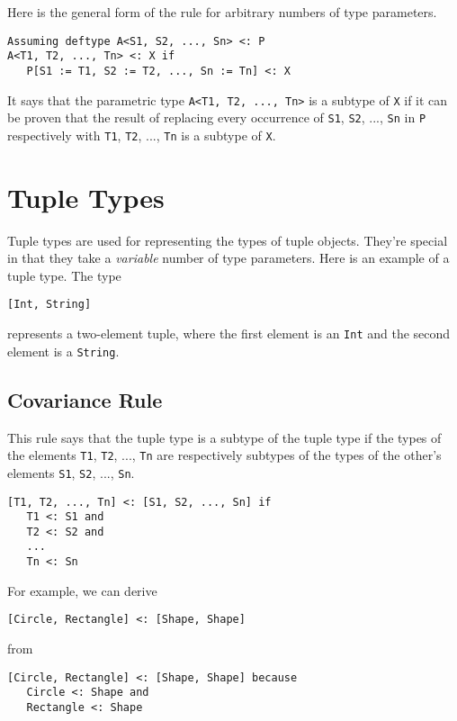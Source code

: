 \documentclass[10pt,oneside]{book}
\begin{document}
Here is the general form of the rule for arbitrary numbers of type parameters.
\begin{lstlisting}
Assuming deftype A<S1, S2, ..., Sn> <: P
A<T1, T2, ..., Tn> <: X if
   P[S1 := T1, S2 := T2, ..., Sn := Tn] <: X
\end{lstlisting}
It says that the parametric type \texttt{\frenchspacing A<T1, T2, ..., Tn>} is a subtype of \texttt{\frenchspacing X} if it can be proven that the result of replacing every occurrence of \texttt{\frenchspacing S1}, \texttt{\frenchspacing S2}, ..., \texttt{\frenchspacing Sn} in \texttt{\frenchspacing P} respectively with \texttt{\frenchspacing T1}, \texttt{\frenchspacing T2}, ..., \texttt{\frenchspacing Tn} is a subtype of \texttt{\frenchspacing X}.

\section{Tuple Types}
Tuple types are used for representing the types of tuple objects. They're special in that they take a {\em variable} number of type parameters. Here is an example of a tuple type. The type
\begin{lstlisting}
[Int, String]
\end{lstlisting}
represents a two-element tuple, where the first element is an \texttt{\frenchspacing Int} and the second element is a \texttt{\frenchspacing String}.

\subsection*{Covariance Rule}
This rule says that the tuple type \texttt{\frenchspacing [T1, T2, ..., Tn]} is a subtype of the tuple type \texttt{\frenchspacing [S1, S2, ..., Sn]} if the types of the elements \texttt{\frenchspacing T1}, \texttt{\frenchspacing T2}, ..., \texttt{\frenchspacing Tn} are respectively subtypes of the types of the other's elements \texttt{\frenchspacing S1}, \texttt{\frenchspacing S2}, ..., \texttt{\frenchspacing Sn}.
\begin{lstlisting}
[T1, T2, ..., Tn] <: [S1, S2, ..., Sn] if
   T1 <: S1 and
   T2 <: S2 and
   ...
   Tn <: Sn
\end{lstlisting}
For example, we can derive
\begin{lstlisting}
[Circle, Rectangle] <: [Shape, Shape]
\end{lstlisting}
from
\begin{lstlisting}
[Circle, Rectangle] <: [Shape, Shape] because
   Circle <: Shape and
   Rectangle <: Shape
\end{lstlisting}
\end{document}
